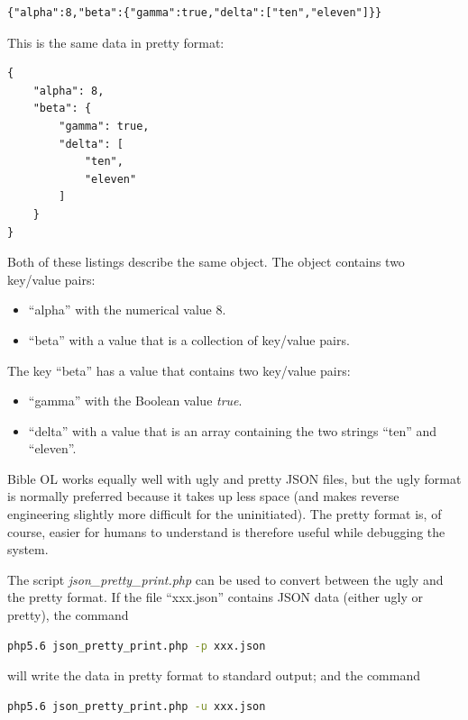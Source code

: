 \documentclass[11pt,oneside,a4paper]{memoir}
\begin{document}
\begin{lstlisting}
{"alpha":8,"beta":{"gamma":true,"delta":["ten","eleven"]}}
\end{lstlisting}

This is the same data in pretty format:

\begin{lstlisting}
{
    "alpha": 8,
    "beta": {
        "gamma": true,
        "delta": [
            "ten",
            "eleven"
        ]
    }
}
\end{lstlisting}

Both of these listings describe the same object. The object contains two key/value pairs:

\begin{itemize}
\item ``alpha'' with the numerical value 8.
\item ``beta'' with a value that is a collection of key/value pairs.
\end{itemize}

The key ``beta'' has a value that contains two key/value pairs:

\begin{itemize}
\item ``gamma'' with the Boolean value \emph{true}.
\item ``delta'' with a value that is an array containing the two strings ``ten'' and ``eleven''.
\end{itemize}


Bible OL works equally well with ugly and pretty JSON files, but the ugly format is normally
preferred because it takes up less space (and makes reverse engineering slightly more difficult for
the uninitiated). The pretty format is, of course, easier for humans to understand is therefore useful
while debugging the system.

The script \emph{json\_pretty\_print.php} can be used to convert
between the ugly and the pretty format. If the file
``xxx.json'' contains JSON data (either ugly or pretty), the command

\begin{lstlisting}[language=bash]
php5.6 json_pretty_print.php -p xxx.json
\end{lstlisting}

\noindent
will write the data in pretty format to standard output; and the command

\begin{lstlisting}[language=bash]
php5.6 json_pretty_print.php -u xxx.json
\end{lstlisting}
\end{document}
